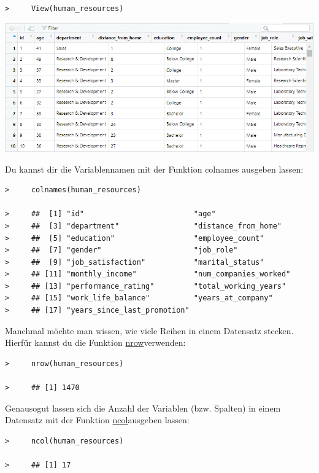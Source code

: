 \documentclass[
]{book}
\begin{document}
\begin{verbatim}
>     View(human_resources)
\end{verbatim}

\includegraphics{images/02_grundlagen/view_hr.png}

Du kannst dir die Variablennamen mit der Funktion colnames ausgeben lassen:

\begin{verbatim}
>     colnames(human_resources)

>     ##  [1] "id"                         "age"                       
>     ##  [3] "department"                 "distance_from_home"        
>     ##  [5] "education"                  "employee_count"            
>     ##  [7] "gender"                     "job_role"                  
>     ##  [9] "job_satisfaction"           "marital_status"            
>     ## [11] "monthly_income"             "num_companies_worked"      
>     ## [13] "performance_rating"         "total_working_years"       
>     ## [15] "work_life_balance"          "years_at_company"          
>     ## [17] "years_since_last_promotion"
\end{verbatim}

Manchmal möchte man wissen, wie viele Reihen in einem Datensatz stecken. Hierfür kannst du die Funktion \href{https://www.rdocumentation.org/packages/base/versions/3.6.1/topics/nrow}{nrow}verwenden:

\begin{verbatim}
>     nrow(human_resources)

>     ## [1] 1470
\end{verbatim}

Genausogut lassen sich die Anzahl der Variablen (bzw. Spalten) in einem Datensatz mit der Funktion \href{https://www.rdocumentation.org/packages/base/versions/3.6.1/topics/nrow}{ncol}ausgeben lassen:

\begin{verbatim}
>     ncol(human_resources)

>     ## [1] 17
\end{verbatim}
\end{document}
